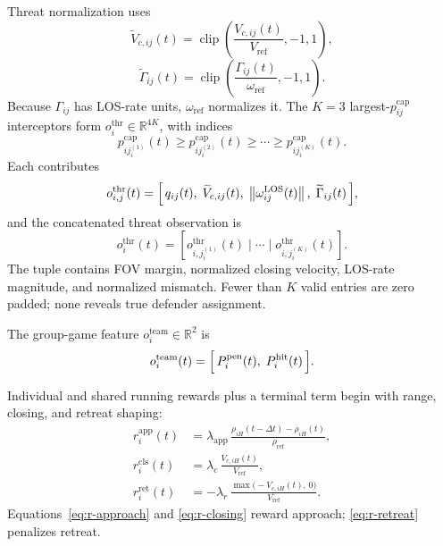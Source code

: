 \documentclass{cja}
\begin{document}
Threat normalization uses
\begin{equation}
\widetilde V_{c,ij}(t)
=
\operatorname{clip}\!\left(
\frac{V_{c,ij}(t)}{V_{\mathrm{ref}}},
-1,1
\right),
\end{equation}
\begin{equation}
\widetilde\Gamma_{ij}(t)
=
\operatorname{clip}\!\left(
\frac{\Gamma_{ij}(t)}{\omega_{\mathrm{ref}}},
-1,1
\right).
\end{equation}
Because $\Gamma_{ij}$ has LOS-rate units, $\omega_{\mathrm{ref}}$ normalizes it. The $K=3$ largest-$p_{ij}^{\mathrm{cap}}$ interceptors form $o_i^{\mathrm{thr}}\in\mathbb{R}^{4K}$, with indices
\begin{equation}
p_{i j_i^{(1)}}^{\mathrm{cap}}(t)
\ge p_{i j_i^{(2)}}^{\mathrm{cap}}(t)
\ge\cdots\ge
p_{i j_i^{(K)}}^{\mathrm{cap}}(t).
\end{equation}
Each contributes
\begin{equation}
o_{i,j}^{\mathrm{thr}}(t)=
\Bigl[\,
q_{ij}(t),\;
\widetilde V_{c,ij}(t),\;
\left\|\omega_{ij}^{\mathrm{LOS}}(t)\right\|,\;
\widetilde\Gamma_{ij}(t)
\,\Bigr],
\label{eq:obs-thr}
\end{equation}
and the concatenated threat observation is
\begin{equation}
o_i^{\mathrm{thr}}(t)
=
\left[
o_{i,j_i^{(1)}}^{\mathrm{thr}}(t)
\mid\cdots\mid
o_{i,j_i^{(K)}}^{\mathrm{thr}}(t)
\right].
\end{equation}
The tuple contains FOV margin, normalized closing velocity, LOS-rate magnitude, and normalized mismatch. Fewer than $K$ valid entries are zero padded; none reveals true defender assignment.

The group-game feature $o_i^{\mathrm{team}}\in\mathbb{R}^{2}$ is
\begin{equation}
o_i^{\mathrm{team}}(t)=\Bigl[\,P_i^{\mathrm{pen}}(t),\;P_i^{\mathrm{hit}}(t)\,\Bigr].
\label{eq:obs-team}
\end{equation}

Individual and shared running rewards plus a terminal term begin with range, closing, and retreat shaping:
\begin{align}
r_i^{\mathrm{app}}(t)&=\lambda_{\mathrm{app}}\,\frac{\rho_{iH}(t-\Delta t)-\rho_{iH}(t)}{\rho_{\mathrm{ref}}},
\label{eq:r-approach}\\
r_i^{\mathrm{cls}}(t)&=\lambda_{c}\,\frac{V_{c,iH}(t)}{V_{\mathrm{ref}}},
\label{eq:r-closing}\\
r_i^{\mathrm{ret}}(t)&=-\lambda_r\,\frac{\max\bigl(-V_{c,iH}(t),\,0\bigr)}{V_{\mathrm{ref}}}.
\label{eq:r-retreat}
\end{align}
Equations~\eqref{eq:r-approach} and \eqref{eq:r-closing} reward approach; \eqref{eq:r-retreat} penalizes retreat.
\end{document}
